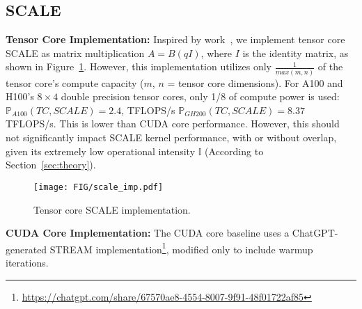\subsection{SCALE}

\noindent\textbf{Tensor Core Implementation:}
Inspired by work~\cite{navarro2020gpu}, we implement tensor core SCALE as matrix multiplication $A=B(qI)$, where $I$ is the identity matrix, as shown in Figure~\ref{fig:scaleimp}.
However, this implementation utilizes only $\tfrac{1}{max(m,n)}$ of the tensor core's compute capacity ($m$, $n$ = tensor core dimensions). For A100 and H100's $8\times4$ double precision tensor cores, only 1/8 of compute power is used:
$\mathbb{P}_{A100}(TC,SCALE)=2.4$, TFLOPS/s $\mathbb{P}_{GH200}(TC,SCALE)=8.37$ TFLOPS/s. This is lower than CUDA core performance. However, this should not significantly impact SCALE kernel performance, with or without overlap, given its extremely low operational intensity $\mathbb{I}$ (According to Section~\ref{sec:theory}).


\begin{figure}[t!]
    \centering
    \texttt{[image: FIG/scale\_imp.pdf]}
    \vspace{-24pt}
    \caption{Tensor core SCALE implementation.}
    \label{fig:scaleimp}
\end{figure}

\noindent\textbf{CUDA Core Implementation:}
The CUDA core baseline uses a ChatGPT-generated STREAM implementation{\footnote{\url{https://chatgpt.com/share/67570ae8-4554-8007-9f91-48f01722af85}}}, modified only to include warmup iterations.



